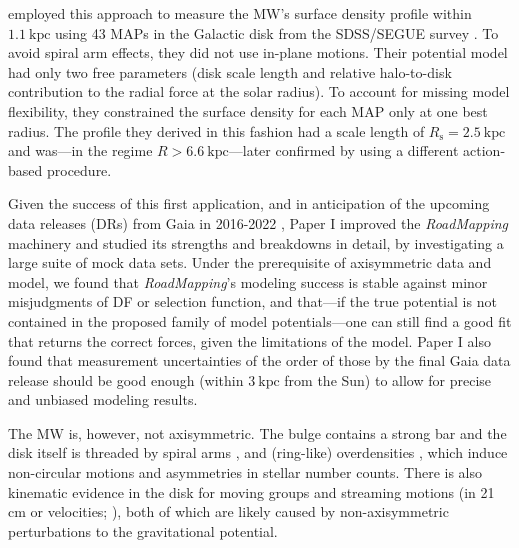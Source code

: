 \documentclass[iop,revtex4,numberedappendix,appendixfloats]{emulateapj}
\newcommand{\RM}{{\sl RoadMapping}}
\begin{document}
\citet{2013ApJ...779..115B} employed this approach to measure the MW's surface density profile within $1.1~\text{kpc}$ using 43 MAPs in the Galactic disk from the SDSS/SEGUE survey \citep{2009AJ....137.4377Y}. To avoid spiral arm effects, they did not use in-plane motions. Their potential model had only two free parameters (disk scale length and relative halo-to-disk contribution to the radial force at the solar radius). To account for missing model flexibility, they constrained the surface density for each MAP only at one best radius. The profile they derived in this fashion had a scale length of $R_\text{s}=2.5~\text{kpc}$ and was---in the regime $R>6.6~\text{kpc}$---later confirmed by \citet{2014MNRAS.445.3133P} using a different action-based procedure.

Given the success of this first application, and in anticipation of the upcoming data releases (DRs) from Gaia in 2016-2022 \citep{2013CEAB...37..115E}, Paper I improved the \RM{} machinery and studied its strengths and breakdowns in detail, by investigating a large suite of mock data sets. Under the prerequisite of axisymmetric data and model, we found that \RM{}'s modeling success is stable against minor misjudgments of DF or selection function, and that---if the true potential is not contained in the proposed family of model potentials---one can still find a good fit that returns the correct forces, given the limitations of the model. Paper I also found that measurement uncertainties of the order of those by the final Gaia data release should be good enough (within $3~\text{kpc}$ from the Sun) to allow for precise and unbiased modeling results. 

The MW is, however, not axisymmetric. The bulge contains a strong bar \citep{1980ApJ...236..779L,1991MNRAS.252..210B,1997MNRAS.288..365B,1991ApJ...379..631B,2000MNRAS.317L..45H,2013MNRAS.435.1874W} and the disk itself is threaded by spiral arms \citep{1958MNRAS.118..379O,1976A&A....49...57G,2009PASP..121..213C,2014ApJ...783..130R}, and (ring-like) overdensities \citep{2002ApJ...569..245N,2008ApJ...673..864J,2015ApJ...801..105X}, which induce non-circular motions and asymmetries in stellar number counts. There is also kinematic evidence in the disk for moving groups \citep{1998AJ....115.2384D,2005A&A...430..165F,2009ApJ...700.1794B,2010ApJ...717..617B} and streaming motions (in 21 cm or velocities; \citealt{2012MNRAS.425.2335S,2013MNRAS.436..101W,2015ApJ...800...83B}), both of which are likely caused by non-axisymmetric perturbations to the gravitational potential.
\end{document}
